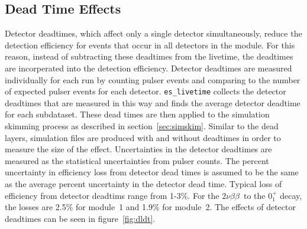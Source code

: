 \documentclass[notitlepage,rmp,aps,10pt]{revtex4-1}
\newcommand{\tnbb}{${2 \nu \beta \beta}$}
\newcommand{\SP}[3]{$#1^{#2}_{#3}$}
\begin{document}
\subsection{Dead Time Effects} \label{sec:DT}
Detector deadtimes, which affect only a single detector simultaneously, reduce the detection efficiency for events that occur in all detectors in the module.
For this reason, instead of subtracting these deadtimes from the livetime, the deadtimes are incorperated into the detection efficiency.
Detector deadtimes are measured individually for each run by counting pulser events and comparing to the number of expected pulser events for each detector.
\texttt{es\_livetime} collects the detector deadtimes that are measured in this way and finds the average detector deadtime for each subdataset.
These dead times are then applied to the simulation skimming process as described in section~\ref{sec:simskim}.
Similar to the dead layers, simulation files are produced with and without deadtimes in order to measure the size of the effect.
Uncertainties in the detector deadtimes are measured as the statistical uncertainties from pulser counts.
The percent uncertainty in efficiency loss from detector dead times is assumed to be the same as the average percent uncertainty in the detector dead time.
Typical loss of efficiency from detector deadtims range from 1-3\%.
For the \tnbb\ to the \SP{0}{+}{1} decay, the losses are 2.5\% for module~1 and 1.9\% for module~2.
The effects of detector deadtimes can be seen in figure~\ref{fig:dldt}.
\\
\end{document}
